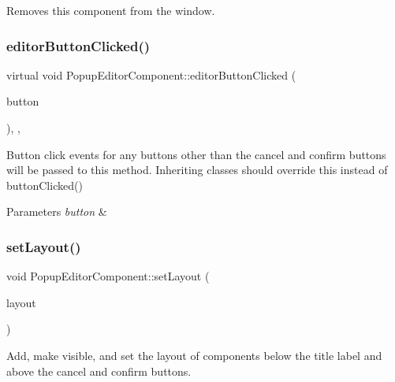 Removes this component from the window. \mbox{\label{classPopupEditorComponent_a04250e5a637bacee146d8cd433413446}} 
\subsubsection{\texorpdfstring{editor\+Button\+Clicked()}{editorButtonClicked()}}
{\footnotesize\ttfamily virtual void Popup\+Editor\+Component\+::editor\+Button\+Clicked (\begin{DoxyParamCaption}\item[{Button $\ast$}]{button }\end{DoxyParamCaption})\hspace{0.3cm}{\ttfamily [inline]}, {\ttfamily [protected]}, {\ttfamily [virtual]}}

Button click events for any buttons other than the cancel and confirm buttons will be passed to this method. Inheriting classes should override this instead of button\+Clicked()


\begin{DoxyParams}{Parameters}
{\em button} & \\
\hline
\end{DoxyParams}
\mbox{\label{classPopupEditorComponent_a7dcb8e2d6f2cc8e43ff737e24aef687a}} 
\subsubsection{\texorpdfstring{set\+Layout()}{setLayout()}}
{\footnotesize\ttfamily void Popup\+Editor\+Component\+::set\+Layout (\begin{DoxyParamCaption}\item[{\mbox{\hyperlink{classRelativeLayoutManager_a3dcd4cd0bc41754f3b4a64bc29b5eca5}{Relative\+Layout\+Manager\+::\+Layout}}}]{layout }\end{DoxyParamCaption})\hspace{0.3cm}{\ttfamily [protected]}}

Add, make visible, and set the layout of components below the title label and above the cancel and confirm buttons.


